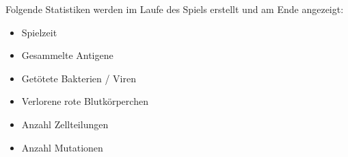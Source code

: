 Folgende Statistiken werden im Laufe des Spiels erstellt und am Ende angezeigt:
\begin{itemize}
  \item Spielzeit
  \item Gesammelte Antigene
  \item Getötete Bakterien / Viren
  \item Verlorene rote Blutkörperchen
  \item Anzahl Zellteilungen
  \item Anzahl Mutationen
\end{itemize}
